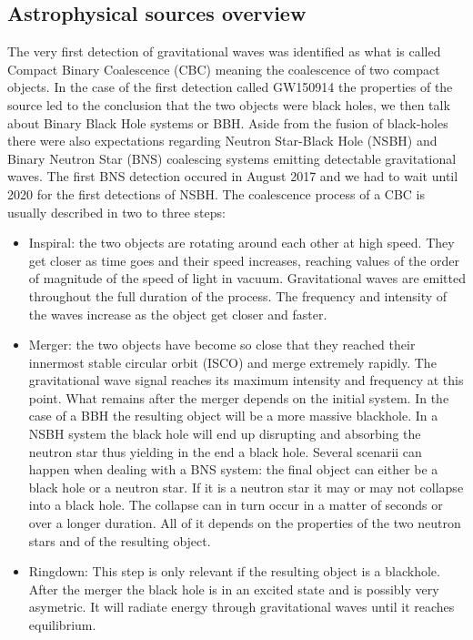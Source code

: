 \subsection{Astrophysical sources overview}
\label{sec:sources}
%
The very first detection of gravitational waves was identified as what is called Compact Binary Coalescence (CBC) meaning the coalescence of two compact objects.
In the case of the first detection called GW150914 the properties of the source led to the conclusion that the two objects were black holes, we then talk about Binary Black Hole systems or BBH.
Aside from the fusion of black-holes there were also expectations regarding Neutron Star-Black Hole (NSBH) and Binary Neutron Star (BNS) coalescing systems emitting detectable gravitational waves.
The first BNS detection occured in August 2017 and we had to wait until 2020 for the first detections of NSBH.
The coalescence process of a CBC is usually described in two to three steps:
\begin{itemize}

\item Inspiral: the two objects are rotating around each other at high speed.
  They get closer as time goes and their speed increases, reaching values of the order of magnitude of the speed of light in vacuum.
  Gravitational waves are emitted throughout the full duration of the process.
  The frequency and intensity of the waves increase as the object get closer and faster.
  
\item Merger: the two objects have become so close that they reached their innermost stable circular orbit (ISCO) and merge extremely rapidly.
  The gravitational wave signal reaches its maximum intensity and frequency at this point.
  What remains after the merger depends on the initial system.
  In the case of a BBH the resulting object will be a more massive blackhole.
  In a NSBH system the black hole will end up disrupting and absorbing the neutron star thus yielding in the end a black hole.
  Several scenarii can happen when dealing with a BNS system: the final object can either be a black hole or a neutron star.
  If it is a neutron star it may or may not collapse into a black hole. The collapse can in turn occur in a matter of seconds or over a longer duration.
  All of it depends on the properties of the two neutron stars and of the resulting object.
  
\item Ringdown: This step is only relevant if the resulting object is a blackhole.
  After the merger the black hole is in an excited state and is possibly very asymetric.
  It will radiate energy through gravitational waves until it reaches equilibrium.

\end{itemize}

